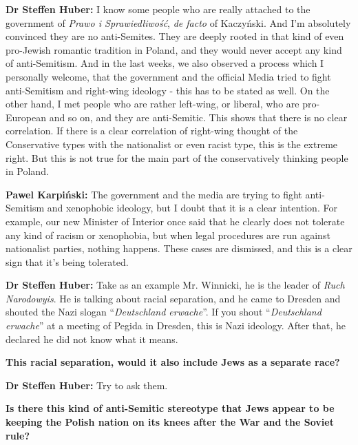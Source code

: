 \textbf{Dr Steffen Huber:} I know some people who are really attached to the government of \textit{Prawo i Sprawiedliwość}, \textit{de facto} of Kaczyński. And I'm absolutely convinced they are no anti-Semites. They are deeply rooted in that kind of even pro-Jewish romantic tradition in Poland, and they would never accept any kind of anti-Semitism. And in the last weeks, we also observed a process which I personally welcome, that the government and the official Media tried to fight anti-Semitism and right-wing ideology - this has to be stated as well. On the other hand, I met people who are rather left-wing, or liberal, who are pro-European and so on, and they are anti-Semitic. This shows that there is no clear correlation. If there is a clear correlation of right-wing thought of the Conservative types with the nationalist or even racist type, this is the extreme right. But this is not true for the main part of the conservatively thinking people in Poland. \par
\textbf{Pawel Karpiński:} The government and the media are trying to fight anti-Semitism and xenophobic ideology, but I doubt that it is a clear intention. For example, our new Minister of Interior once said that he clearly does not tolerate any kind of racism or xenophobia, but when legal procedures are run against nationalist parties, nothing happens. These cases are dismissed, and this is a clear sign that it’s being tolerated.\par
\textbf{Dr Steffen Huber:} Take as an example Mr. Winnicki, he is the leader of \textit{Ruch Narodowyis}. He is talking about racial separation, and he came to Dresden and shouted the Nazi slogan “\textit{Deutschland erwache}”. If you shout “\textit{Deutschland erwache}” at a meeting of Pegida in Dresden, this is Nazi ideology. After that, he declared he did not know what it means.  

\textbf{This racial separation, would it also include Jews as a separate race?}

\textbf{Dr Steffen Huber:} Try to ask them.  

\textbf{Is there this kind of anti-Semitic stereotype that Jews appear to be keeping the Polish nation on its knees after the War and the Soviet rule?} 

